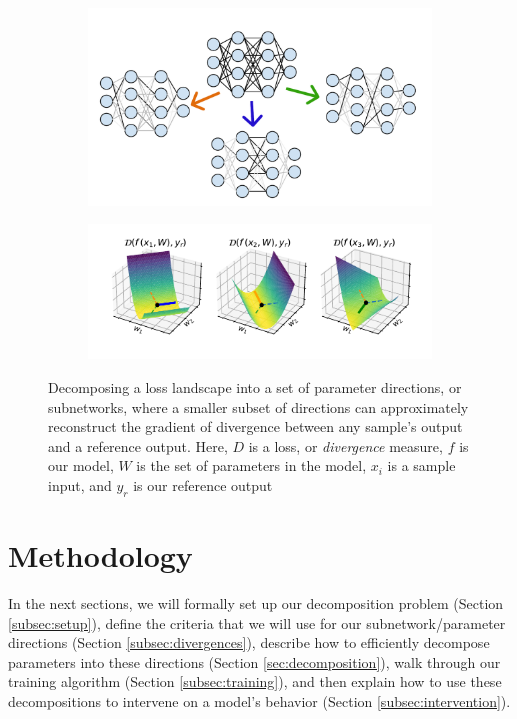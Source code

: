 \documentclass{article}
\theoremstyle{plain}
\theoremstyle{definition}
\theoremstyle{remark}
\begin{document}
\begin{figure}
    \begin{subfigure}{\columnwidth}
        \centering
        \includegraphics[width=.7\textwidth]{../figures/1b_jacobian_diagram.pdf}
    \end{subfigure}
    \begin{subfigure}{\columnwidth}
        \centering
        \includegraphics[width=\textwidth]{../figures/1a_jacobian_diagram.pdf}
    \end{subfigure} \caption{Decomposing a loss landscape into a set of parameter directions, or subnetworks, where a smaller subset of directions can approximately reconstruct the gradient of divergence between any sample's output and a reference output. Here, $D$ is a loss, or \textit{divergence} measure, $f$ is our model, $W$ is the set of parameters in the model, $x_i$ is a sample input, and $y_r$ is our reference output}\label{fig:1_jacobian_diagram}
    
\end{figure}

\section{Methodology}\label{sec:methods}

In the next sections, we will formally set up our decomposition problem (Section \ref{subsec:setup}), define the criteria that we will use for our subnetwork/parameter directions (Section \ref{subsec:divergences}), describe how to efficiently decompose parameters into these directions (Section \ref{sec:decomposition}), walk through our training algorithm (Section \ref{subsec:training}), and then explain how to use these decompositions to intervene on a model's behavior (Section \ref{subsec:intervention}). 
\end{document}
